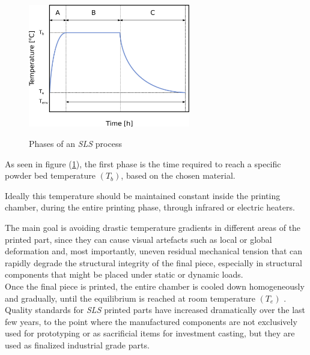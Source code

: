 \documentclass{article}
\begin{document}
    \begin{figure}[h!]
        \centering
        \includegraphics[width=0.63\textwidth]{Pictures/SLS_temp_over_time.eps}\\
        \caption{Phases of an \textit{SLS} process \autocites{Inkscape}{Padovano_SLS_Review}} 
        \label{fig:SLS_temp_over_time}
    \end{figure}

    As seen in figure (\ref{fig:SLS_temp_over_time}), the first phase is the time required to reach a specific powder bed temperature $(T_b)$, based on the chosen material. 

    Ideally this temperature should be maintained constant inside the printing
    chamber, during the entire printing phase, through infrared or electric heaters. 
    
    The main goal is avoiding drastic temperature gradients in different areas of the printed part, since they can cause 
    visual artefacts such as local or global deformation and, most importantly, uneven residual mechanical tension that can 
    rapidly degrade the structural integrity of the final piece, especially in structural components that might be placed under static or
    dynamic loads. \\ 
    
    Once the final piece is printed, the entire chamber is cooled down homogeneously and gradually, until the equilibrium is reached at room 
    temperature $(T_e)$ \autocite*{Padovano_SLS_Review}. \\ 

    Quality standards for \textit{SLS} printed parts have increased dramatically over the last few years, to the point where 
    the manufactured components are not exclusively used for prototyping or as sacrificial items for investment casting, but they are 
    used as finalized industrial grade parts. 
\end{document}
